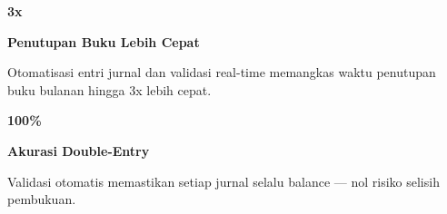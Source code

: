 \documentclass[a4paper]{article}
\begin{document}
\noindent
\begin{minipage}[t]{0.485\textwidth}
    \noindent\colorbox{BlueBg}{%
        \begin{minipage}[t][2.7cm][c]{\dimexpr\linewidth-2\fboxsep\relax}
            \centering
            {\fontsize{20}{24}\selectfont\bfseries\color{BluePrimary} 3x}\par\vspace{2pt}
            {\fontsize{9.5}{12}\selectfont\bfseries\color{BlueDark} Penutupan Buku Lebih Cepat}\par\vspace{2pt}
            {\fontsize{8.5}{11}\selectfont\color{TextDark}Otomatisasi entri jurnal dan validasi real-time memangkas waktu penutupan buku bulanan hingga 3x lebih cepat.}
        \end{minipage}}\par
    \vspace{6pt}
    \noindent\colorbox{BlueBg}{%
        \begin{minipage}[t][2.7cm][c]{\dimexpr\linewidth-2\fboxsep\relax}
            \centering
            {\fontsize{20}{24}\selectfont\bfseries\color{BluePrimary} 100\%}\par\vspace{2pt}
            {\fontsize{9.5}{12}\selectfont\bfseries\color{BlueDark} Akurasi Double-Entry}\par\vspace{2pt}
            {\fontsize{8.5}{11}\selectfont\color{TextDark}Validasi otomatis memastikan setiap jurnal selalu balance — nol risiko selisih pembukuan.}
        \end{minipage}}%
\end{minipage}%
\hfill
\end{document}
